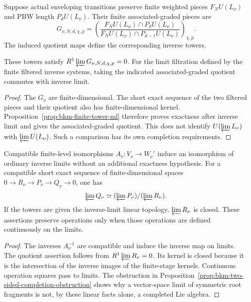 \begin{definition}
\label{def:pbw-associated-graded-ml-datum}
Suppose actual enveloping transitions preserve finite weighted
pieces $F_NU(L_\nu)$ and PBW length $P_dU(L_\nu)$. Their finite
associated-graded pieces are
\[
 G_{\nu,N,d,\chi,\bar p}
 =\left(\frac{F_NU(L_\nu)\cap P_dU(L_\nu)}
              {F_NU(L_\nu)\cap P_{d-1}U(L_\nu)}\right)_{\chi,\bar p}.
\]
The induced quotient maps define the corresponding inverse towers.
\end{definition}

\begin{proposition}
\label{prop:pbw-associated-graded-lim1-vanishing-criterion}
These towers satisfy $R^1\varprojlim G_{\nu,N,d,\chi,\bar p}=0$.
For the limit filtration defined by the finite filtered inverse
systems, taking the indicated associated-graded quotient commutes
with inverse limit.
\end{proposition}
\begin{proof}
The $G_\nu$ are finite-dimensional. The short exact sequence of
the two filtered pieces and their quotient also has
finite-dimensional kernel. Proposition~\ref{prop:bkm-finite-tower-ml}
therefore proves exactness after inverse limit and gives the
associated-graded quotient. This does not identify
$U(\varprojlim L_\nu)$ with $\varprojlim U(L_\nu)$. Such a
comparison has its own completion requirements.
\end{proof}

\begin{proposition}
\label{prop:strict-ml-completion-primitive-recognition}
Compatible finite-level isomorphisms $A_\nu:V_\nu\to W_\nu'$
induce an isomorphism of ordinary inverse limits without an
additional exactness hypothesis. For a compatible short exact
sequence of finite-dimensional spaces
$0\to R_\nu\to P_\nu\to Q_\nu\to0$, one has
\[
 \varprojlim Q_\nu\simeq
       (\varprojlim P_\nu)/(\varprojlim R_\nu).
\]
If the towers are given the inverse-limit linear topology,
$\varprojlim R_\nu$ is closed. These assertions preserve operations
only when those operations are defined continuously on the limits.
\end{proposition}
\begin{proof}
The inverses $A_\nu^{-1}$ are compatible and induce the inverse
map on limits. The quotient assertion follows from
$R^1\varprojlim R_\nu=0$. Its kernel is closed because it is the
intersection of the inverse images of the finite-stage kernels.
Continuous operation squares pass to limits. The obstruction in
Proposition~\ref{prop:bkm-two-sided-completion-obstruction} shows
why a vector-space limit of symmetric root fragments is not, by
these linear facts alone, a completed Lie algebra.
\end{proof}

